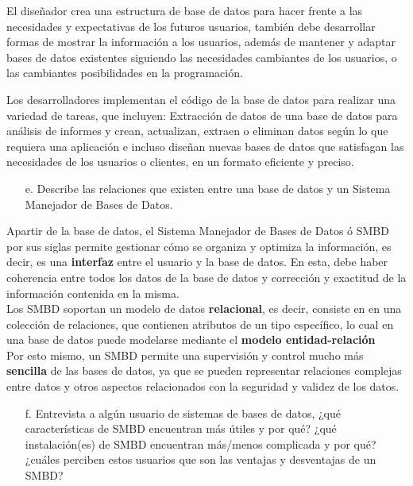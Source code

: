 \documentclass{article}
\begin{document}
\begin{enumerate}
    El diseñador crea una estructura de base de datos para hacer frente a las necesidades y expectativas de los futuros usuarios, también debe desarrollar formas de mostrar la información a los usuarios, además de mantener y adaptar bases de datos existentes siguiendo las necesidades cambiantes de los usuarios, o las cambiantes posibilidades en la programación. 

    Los desarrolladores implementan el código de la base de datos para realizar una variedad de tareas, que incluyen: Extracción de datos de una base de datos para análisis de informes y crean, actualizan, extraen o eliminan datos según lo que requiera una aplicación e incluso diseñan nuevas bases de datos que satisfagan las necesidades de los usuarios o clientes, en un formato eficiente y preciso.
    
\begin{itemize}
    \item[e.]Describe las relaciones que existen entre una base de datos y un Sistema Manejador de Bases de Datos.
    \end{itemize}
Apartir de la base de datos, el Sistema Manejador de Bases de Datos ó SMBD por sus siglas permite gestionar cómo se organiza y optimiza la información, es decir, es una \textbf{interfaz} entre el usuario y la base de datos. En esta, debe haber coherencia entre todos los datos de la base de datos y corrección y exactitud de la información contenida en la misma. \\
Los SMBD soportan un modelo de datos \textbf{relacional}, es decir, consiste en en una colección de relaciones, que contienen atributos de un tipo específico, lo cual en una base de datos puede modelarse mediante el \textbf{modelo entidad-relación}\\
Por esto mismo, un SMBD permite una supervisión y control mucho más \textbf{sencilla} de las bases de datos, ya que se pueden
 representar relaciones complejas entre datos y otros aspectos relacionados con la seguridad y validez de los datos. \\
 
 
 
\begin{itemize}
    \item[f.]Entrevista a algún usuario de sistemas de bases de datos, ¿qué características de SMBD encuentran más útiles y por qué? ¿qué instalación(es) de SMBD encuentran más/menos complicada y por qué? ¿cuáles perciben estos usuarios que son las ventajas y desventajas de un SMBD?
    \end{itemize}
    

\end{enumerate}
\end{document}
